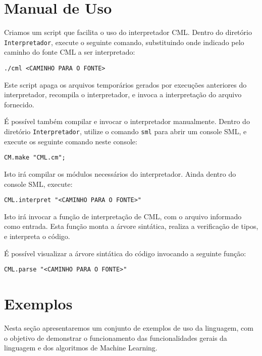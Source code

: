 \documentclass[12pt]{article}
\begin{document}
\section{Manual de Uso}\label{Man}

Criamos um script que facilita o uso do interpretador CML. Dentro do diretório \texttt{Interpretador}, execute o seguinte comando, substituindo onde indicado pelo caminho do fonte CML a ser interpretado:

\begin{verbatim}
./cml <CAMINHO PARA O FONTE>
\end{verbatim}

Este script apaga os arquivos temporários gerados por execuções anteriores do interpretador, recompila o interpretador, e invoca a interpretação do arquivo fornecido.

É possível também compilar e invocar o interpretador manualmente. Dentro do diretório \texttt{Interpretador}, utilize o comando \texttt{sml} para abrir um console SML, e execute os seguinte comando neste console:

\begin{verbatim}
CM.make "CML.cm";
\end{verbatim}

Isto irá compilar os módulos necessários do interpretador. Ainda dentro do console SML, execute:

\begin{verbatim}
CML.interpret "<CAMINHO PARA O FONTE>"
\end{verbatim}

Isto irá invocar a função de interpretação de CML, com o arquivo informado como entrada. Esta função monta a árvore sintática, realiza a verificação de tipos, e interpreta o código.

É possível visualizar a árvore sintática do código invocando a seguinte função:

\begin{verbatim}
CML.parse "<CAMINHO PARA O FONTE>"
\end{verbatim}

\section{Exemplos}\label{Exemplos}

Nesta seção apresentaremos um conjunto de exemplos de uso da linguagem, com o objetivo de demonstrar o funcionamento das funcionalidades gerais da linguagem e dos algoritmos de Machine Learning.
\end{document}
